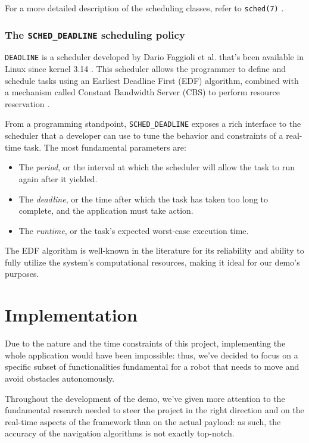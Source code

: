 \documentclass[a4paper,12pt]{report}
\begin{document}
For a more detailed description of the scheduling classes, refer to \texttt{sched(7)} \cite{man-sched-7}.

\subsubsection{The \texttt{SCHED\_DEADLINE} scheduling policy}

\texttt{DEADLINE} is a scheduler developed by Dario Faggioli et al. \cite{lwn-faggioli-mail} that's been available in Linux since kernel 3.14 \cite{kn-linux-314}. This scheduler allows the programmer to define and schedule tasks using an Earliest Deadline First (EDF) algorithm, combined with a mechanism called Constant Bandwidth Server (CBS) to perform resource reservation \cite{cbs-algorithm}.

From a programming standpoint, \texttt{SCHED\_DEADLINE} exposes a rich interface to the scheduler that a developer can use to tune the behavior and constraints of a real-time task. The most fundamental parameters are: 

\begin{itemize}
    \item The \textit{period}, or the interval at which the scheduler will allow the task to run again after it yielded.
    \item The \textit{deadline}, or the time after which the task has taken too long to complete, and the application must take action.
    \item The \textit{runtime}, or the task's expected worst-case execution time.
\end{itemize}

The EDF algorithm is well-known in the literature for its reliability and ability to fully utilize the system's computational resources\cite{buttazzo-hard-rt}, making it ideal for our demo's purposes.

\section{Implementation}

Due to the nature and the time constraints of this project, implementing the whole application would have been impossible: thus, we've decided to focus on a specific subset of functionalities fundamental for a robot that needs to move and avoid obstacles autonomously. 

Throughout the development of the demo, we've given more attention to the fundamental research needed to steer the project in the right direction and on the real-time aspects of the framework than on the actual payload: as such, the accuracy of the navigation algorithms is not exactly top-notch.
\end{document}
